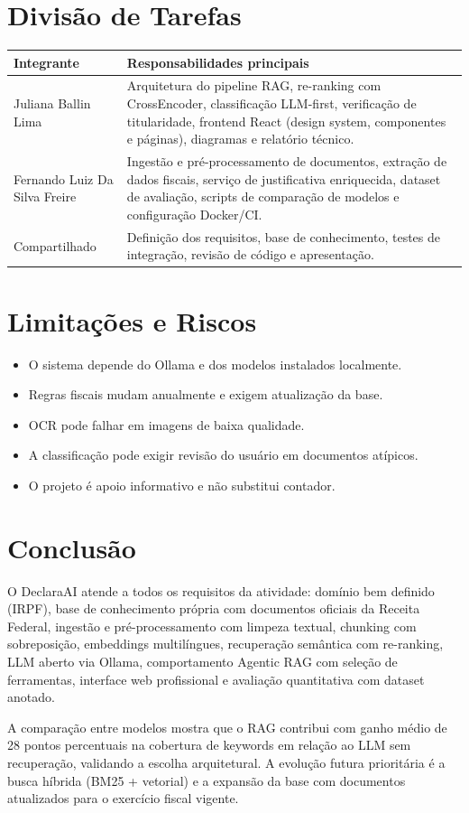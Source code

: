 \documentclass[11pt,a4paper,oneside]{article}
\begin{document}
\section{Divisão de Tarefas}

\begin{center}
\begin{tabularx}{\textwidth}{@{}L{62mm}Y@{}}
\toprule
\textbf{Integrante} & \textbf{Responsabilidades principais} \\
\midrule
Juliana Ballin Lima & Arquitetura do pipeline RAG, re-ranking com CrossEncoder, classificação LLM-first, verificação de titularidade, frontend React (design system, componentes e páginas), diagramas e relatório técnico. \\
Fernando Luiz Da Silva Freire & Ingestão e pré-processamento de documentos, extração de dados fiscais, serviço de justificativa enriquecida, dataset de avaliação, scripts de comparação de modelos e configuração Docker/CI. \\
\midrule
Compartilhado & Definição dos requisitos, base de conhecimento, testes de integração, revisão de código e apresentação. \\
\bottomrule
\end{tabularx}
\end{center}

\section{Limitações e Riscos}

\begin{itemize}[leftmargin=7mm]
  \item O sistema depende do Ollama e dos modelos instalados localmente.
  \item Regras fiscais mudam anualmente e exigem atualização da base.
  \item OCR pode falhar em imagens de baixa qualidade.
  \item A classificação pode exigir revisão do usuário em documentos atípicos.
  \item O projeto é apoio informativo e não substitui contador.
\end{itemize}

\section{Conclusão}

O DeclaraAI atende a todos os requisitos da atividade: domínio bem definido (IRPF), base de conhecimento própria com documentos oficiais da Receita Federal, ingestão e pré-processamento com limpeza textual, chunking com sobreposição, embeddings multilíngues, recuperação semântica com re-ranking, LLM aberto via Ollama, comportamento Agentic RAG com seleção de ferramentas, interface web profissional e avaliação quantitativa com dataset anotado.

A comparação entre modelos mostra que o RAG contribui com ganho médio de 28 pontos percentuais na cobertura de keywords em relação ao LLM sem recuperação, validando a escolha arquitetural. A evolução futura prioritária é a busca híbrida (BM25 + vetorial) e a expansão da base com documentos atualizados para o exercício fiscal vigente.
\end{document}
